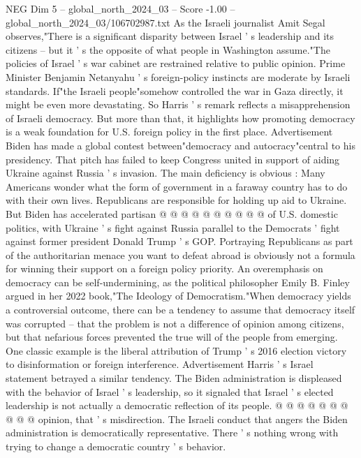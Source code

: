 \begin{textsample}{NEG Dim 5 – global\_north\_2024\_03 – Score -1.00 – global\_north\_2024\_03/106702987.txt}  \label{ex:f5_neg_165}
As the Israeli journalist Amit Segal observes,"There is a significant disparity between Israel ' s leadership and its citizens -- but it ' s the opposite of what people in Washington assume."The policies of Israel ' s war cabinet are restrained relative to public opinion.
Prime Minister Benjamin Netanyahu ' s foreign-policy instincts are moderate by Israeli standards.
If"the Israeli people"somehow controlled the war in Gaza directly, it might be even more devastating.
So Harris ' s remark reflects a misapprehension of Israeli democracy.
But more than that, it highlights how promoting democracy is a weak foundation for U.S. foreign policy in the first place.
Advertisement Biden has made a global contest between"democracy and autocracy"central to his presidency.
That pitch has failed to keep Congress united in support of aiding Ukraine against Russia ' s invasion.
The main deficiency is obvious : Many Americans wonder what the form of government in a faraway country has to do with their own lives.
Republicans are responsible for holding up aid to Ukraine.
But Biden has accelerated partisan @ @ @ @ @ @ @ @ @ @ of U.S. domestic politics, with Ukraine ' s fight against Russia parallel to the Democrats ' fight against former president Donald Trump ' s GOP.
Portraying Republicans as part of the authoritarian menace you want to defeat abroad is obviously not a formula for winning their support on a foreign policy priority.
An overemphasis on democracy can be self-undermining, as the political philosopher Emily B.
Finley argued in her 2022 book,"The Ideology of Democratism."When democracy yields a controversial outcome, there can be a tendency to assume that democracy itself was corrupted -- that the problem is not a difference of opinion among citizens, but that nefarious forces prevented the true will of the people from emerging.
One classic example is the liberal attribution of Trump ' s 2016 election victory to disinformation or foreign interference.
Advertisement Harris ' s Israel statement betrayed a similar tendency.
The Biden administration is displeased with the behavior of Israel ' s leadership, so it signaled that Israel ' s elected leadership is not actually a democratic reflection of its people. @ @ @ @ @ @ @ @ @ @ opinion, that ' s misdirection.
The Israeli conduct that angers the Biden administration is democratically representative.
There ' s nothing wrong with trying to change a democratic country ' s behavior.

\end{textsample}
